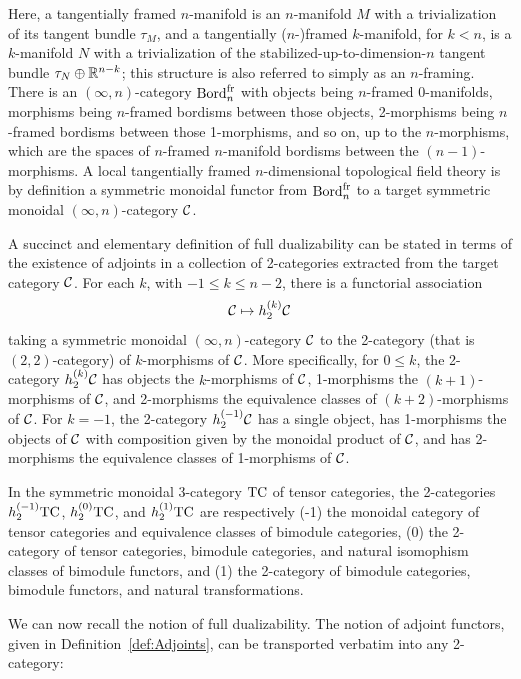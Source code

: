 \documentclass{amsart}
\begin{document}
Here, a tangentially framed $n$-manifold is an $n$-manifold $M$ with a trivialization of its tangent bundle $\tau_M$, and a tangentially ($n$-)framed $k$-manifold, for $k < n$, is a $k$-manifold $N$ with a trivialization of the stabilized-up-to-dimension-$n$ tangent bundle $\tau_N \oplus \mathbb R^{n-k}$; this structure is also referred to simply as an $n$-framing.  There is an $(\infty,n)$-category $\mathrm{Bord}^\mathrm{fr}_n$ with objects being $n$-framed $0$-manifolds, morphisms being $n$-framed bordisms between those objects, 2-morphisms being $n$-framed bordisms between those 1-morphisms, and so on, up to the $n$-morphisms, which are the spaces of $n$-framed $n$-manifold bordisms between the $(n-1)$-morphisms.  A local tangentially framed $n$-dimensional topological field theory is by definition a symmetric monoidal functor from $\mathrm{Bord}^\mathrm{fr}_n$ to a target symmetric monoidal $(\infty,n)$-category $\mathcal C$.

A succinct and elementary definition of full dualizability can be stated in terms of the existence of adjoints in a collection of 2-categories extracted from the target category $\mathcal C$.  For each $k$, with $-1 \leq k \leq n-2$, there is a functorial association
\[
\mathcal C \mapsto h_2^{(k)} \mathcal C
\]
taking a symmetric monoidal $(\infty,n)$-category $\mathcal C$ to the 2-category (that is $(2,2)$-category) of $k$-morphisms of $\mathcal C$.  More specifically, for $0 \leq k$, the 2-category $h_2^{(k)} \mathcal C$ has objects the $k$-morphisms of $\mathcal C$, 1-morphisms the $(k+1)$-morphisms of $\mathcal C$, and 2-morphisms the equivalence classes of $(k+2)$-morphisms of $\mathcal C$.  For $k=-1$, the 2-category $h_2^{(-1)} \mathcal C$ has a single object, has 1-morphisms the objects of $\mathcal C$ with composition given by the monoidal product of $\mathcal C$, and has 2-morphisms the equivalence classes of 1-morphisms of $\mathcal C$.

\begin{appexample}
	In the symmetric monoidal 3-category $\mathrm{TC}$ of tensor categories, the 2-categories $h^{(-1)}_2 \mathrm{TC}$, $h^{(0)}_2 \mathrm{TC}$, and $h^{(1)}_2 \mathrm{TC}$ are respectively (-1) the monoidal category of tensor categories and equivalence classes of bimodule categories, (0) the 2-category of tensor categories, bimodule categories, and natural isomophism classes of bimodule functors, and (1) the 2-category of bimodule categories, bimodule functors, and natural transformations.
\end{appexample}

We can now recall the notion of full dualizability.  The notion of adjoint functors, given in Definition~\ref{def:Adjoints}, can be transported verbatim into any 2-category:
\end{document}
